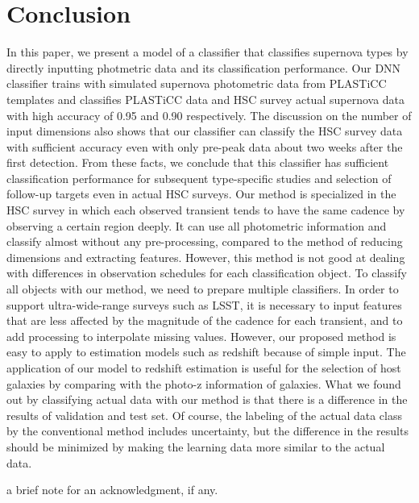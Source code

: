 \documentclass[useamsfonts]{pasj01}
\begin{document}
\section{Conclusion}
%
In this paper, we present a model of a classifier that classifies supernova types by directly inputting photmetric data and its classification performance.
Our DNN classifier trains with simulated supernova photometric data from PLASTiCC templates and classifies PLASTiCC data and HSC survey actual supernova data with high accuracy of 0.95 and 0.90 respectively.
The discussion on the number of input dimensions also shows that our classifier can classify the HSC survey data with sufficient accuracy even with only pre-peak data about two weeks after the first detection.
From these facts, we conclude that this classifier has sufficient classification performance for subsequent type-specific studies and selection of follow-up targets even in actual HSC surveys.
Our method is specialized in the HSC survey in which each observed transient tends to have the same cadence by observing a certain region deeply.
It can use all photometric information and classify almost without any pre-processing, compared to the method of reducing dimensions and extracting features. However, this method is not good at dealing with differences in observation schedules for each classification object.
To classify all objects with our method, we need to prepare multiple classifiers.
In order to support ultra-wide-range surveys such as LSST, it is necessary to input features that are less affected by the magnitude of the cadence for each transient, and to add processing to interpolate missing values.
However, our proposed method is easy to apply to estimation models such as redshift because of simple input. The application of our model to redshift estimation is useful for the selection of host galaxies by comparing with the photo-z information of galaxies.
What we found out by classifying actual data with our method is that there is a difference in the results of validation and test set.
Of course, the labeling of the actual data class by the conventional method includes uncertainty, but the difference in the results should be minimized by making the learning data more similar to the actual data.
%
\begin{ack}
 a brief note for an acknowledgment, if any.   
\end{ack}
%


%
\end{document}
